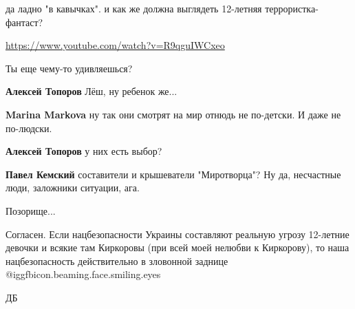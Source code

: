 \begin{itemize}
\begin{itemize}
да ладно "в кавычках". и как же должна выглядеть 12-летняя террористка-фантаст?

\url{https://www.youtube.com/watch?v=R9qguIWCxeo}

\end{itemize} %

Ты еще чему-то удивляешься?

\begin{itemize} %
\textbf{Алексей Топоров} Лёш, ну ребенок же...

\textbf{Marina Markova} ну так они смотрят на мир отнюдь не по-детски. И даже не по-людски.

\textbf{Алексей Топоров} у них есть выбор?

\textbf{Павел Кемский} составители и крышеватели "Миротворца"? Ну да, несчастные люди, заложники ситуации, ага.
\end{itemize} %

Позорище...


Согласен. Если нацбезопасности Украины составляют реальную угрозу 12-летние
девочки и всякие там Киркоровы (при всей моей нелюбви к Киркорову), то наша
нацбезопасность действительно в зловонной заднице  @igg{fbicon.beaming.face.smiling.eyes} 


ДБ

\end{itemize} %
